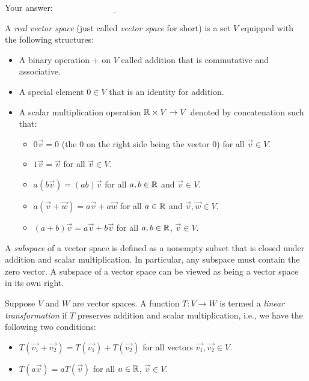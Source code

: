 \documentclass[10pt]{amsart}
\begin{document}
\begin{enumerate}
  \vspace{0.1in}
  Your answer: $\underline{\qquad\qquad\qquad\qquad\qquad\qquad\qquad}$
  \vspace{0.1in}

  A {\em real vector space} (just called {\em vector space} for short)
  is a set $V$ equipped with the following structures:

  \begin{itemize}
  \item A binary operation $+$ on $V$ called addition that is
    commutative and associative.
  \item A special element $0 \in V$ that is an identity for addition.
  \item A scalar multiplication operation $\mathbb{R} \times V \to V$ denoted
    by concatenation such that:
    \begin{itemize}
    \item $0\vec{v} = 0$ (the $0$ on the right side being the vector
      $0$) for all $\vec{v} \in V$.
    \item $1\vec{v} = \vec{v}$ for all $\vec{v} \in V$.
    \item $a(b\vec{v}) = (ab)\vec{v}$ for all $a,b \in \mathbb{R}$ and
      $\vec{v} \in V$.
    \item $a(\vec{v} + \vec{w}) = a\vec{v} + a\vec{w}$ for all $a \in
      \mathbb{R}$ and $\vec{v},\vec{w} \in V$.
    \item $(a + b)\vec{v} = a\vec{v} + b\vec{v}$ for all $a,b \in \mathbb{R}$,
      $\vec{v} \in V$.
    \end{itemize}
  \end{itemize}

  A {\em subspace} of a vector space is defined as a nonempty subset
  that is closed under addition and scalar multiplication. In
  particular, any subspace must contain the zero vector. A subspace of
  a vector space can be viewed as being a vector space in its own
  right.

  Suppose $V$ and $W$ are vector spaces. A function $T: V \to W$ is
  termed a {\em linear transformation} if $T$ preserves addition and
  scalar multiplication, i.e., we have the following two conditions:

  \begin{itemize}
  \item $T(\vec{v_1} + \vec{v_2}) = T(\vec{v_1}) + T(\vec{v_2})$ for
    all vectors $\vec{v_1},\vec{v_2} \in V$.
  \item $T(a\vec{v}) = aT(\vec{v})$ for all $a \in \mathbb{R}$, $\vec{v} \in
    V$.
  \end{itemize}


\end{enumerate}
\end{document}
